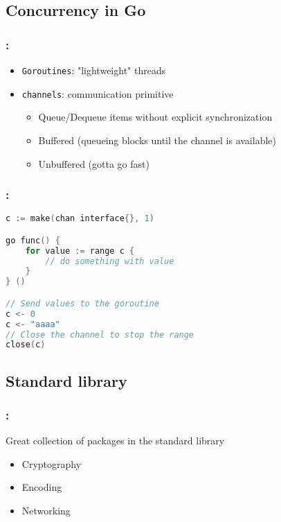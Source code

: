 \subsection{Concurrency in Go}

\begin{frame}
    \frametitle{\secname: \small\subsecname\normalsize}

    \begin{itemize}
        \item \texttt{Goroutines}: "lightweight" threads
        \item \texttt{channels}: communication primitive
        \begin{itemize}
            \item Queue/Dequeue items without explicit synchronization
            \item Buffered (queueing blocks until the channel is available)
            \item Unbuffered (gotta go fast)
        \end{itemize}
    \end{itemize}
\end{frame}

\begin{frame}[fragile]
    \frametitle{\secname: \small\subsecname\normalsize}

    \small \begin{lstlisting}[language=c]
c := make(chan interface{}, 1)

go func() {
    for value := range c {
        // do something with value
    }
} ()

// Send values to the goroutine
c <- 0
c <- "aaaa"
// Close the channel to stop the range
close(c)
    \end{lstlisting} \normalsize
\end{frame}

\subsection{Standard library}

\begin{frame}
    \frametitle{\secname: \small\subsecname\normalsize}

    Great collection of packages in the standard library

    \begin{itemize}
        \item Cryptography
        \item Encoding
        \item Networking
    \end{itemize}
\end{frame}

